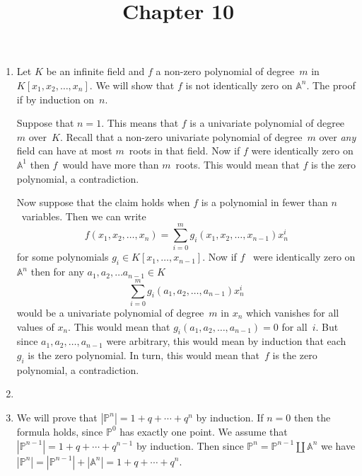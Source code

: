 \documentclass[12pt]{article}
\title{Chapter 10}
\author{}\date{}
\begin{document}
\maketitle

\begin{enumerate}
\item %
Let $K$ be an infinite field and $f$ a non-zero polynomial
of degree~$m$ in $K\left[x_1,x_2,\ldots,x_n\right]$.
We will show that $f$ is not identically
zero on $\mathbb{A}^n$. The proof if by induction on~$n$.

Suppose that $n=1$. This means that $f$ is a univariate polynomial
of degree~$m$ over~$K$. Recall that a non-zero univariate polynomial
of degree~$m$ over {\em any} field can have at most $m$~roots
in that field. Now if $f$ were identically zero on $\mathbb{A}^1$
then $f$~would have more than $m$~roots. This would mean that
$f$ is the zero polynomial, a contradiction.

Now suppose that the claim holds when $f$ is a polynomial
in fewer than $n$~variables. Then we can write
\[f\left(x_1,x_2,\ldots,x_n\right)=\sum_{i=0}^m
g_i\left(x_1,x_2,\ldots,x_{n-1}\right)x_n^i\]
for some polynomials $g_i\in K\left[x_1,\ldots,x_{n-1}\right]$.
Now if $f$~ were identically zero on $\mathbb{A}^n$ then
for any $a_1,a_2,\ldots a_{n-1}\in K$
\[\sum_{i=0}^m g_i\left(a_1,a_2,\ldots,a_{n-1}\right)x_n^i\]
would be a univariate polynomial of degree~$m$ in $x_n$
which vanishes for all values of $x_n$. This would mean
that $g_i\left(a_1,a_2,\ldots,a_{n-1}\right)=0$ for all~$i$.
But since $a_1,a_2,\ldots,a_{n-1}$ were arbitrary, this would
mean by induction that each $g_i$ is the zero polynomial.
In turn, this would mean that~$f$
is the zero polynomial, a contradiction.

\item %
\item %
We will prove that $\left|\mathbb{P}^{n}\right|
=1+q+\cdots+q^n$ by induction.
If $n=0$ then the formula holds, since $\mathbb{P}^0$ has exactly
one point.
We assume that $\left|\mathbb{P}^{n-1}\right|
=1+q+\cdots+q^{n-1}$ by induction.
Then since $\mathbb{P}^n=\mathbb{P}^{n-1}\coprod\mathbb{A}^n$
we have $\left|\mathbb{P}^n\right|
=\left|\mathbb{P}^{n-1}\right|+\left|\mathbb{A}^n\right|
=1+q+\cdots+q^n$.


\end{enumerate}
\end{document}
